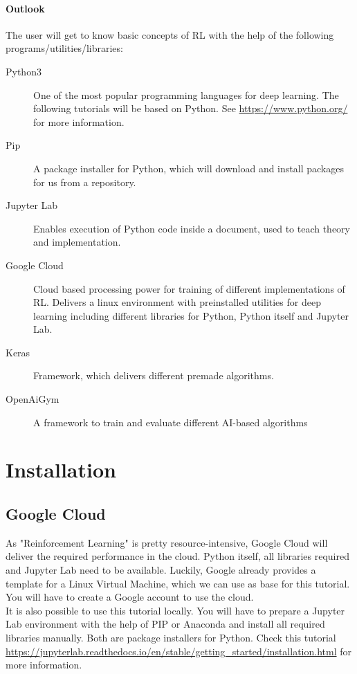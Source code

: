 \documentclass[a4paper]{article}
\begin{document}
\paragraph{Outlook}
The user will get to know basic concepts of RL with the help of the following programs/utilities/libraries:
\begin{description}
	\item[Python3] One of the most popular programming languages for deep learning. The following tutorials will be based on Python. See \url{https://www.python.org/} for more information.
	\item[Pip] A package installer for Python, which will download and install packages for us from a repository.
	\item[Jupyter Lab] Enables execution of Python code inside a document, used to teach theory and implementation. 
	\item[Google Cloud] Cloud based processing power for training of different implementations of RL. Delivers a linux environment with preinstalled utilities for deep learning including different libraries for Python, Python itself and Jupyter Lab.
	\item[Keras] Framework, which delivers different premade algorithms.
	\item[OpenAiGym] A framework to train and evaluate different AI-based algorithms
\end{description}  
\section{Installation}
\subsection{Google Cloud}
As "Reinforcement Learning" is pretty resource-intensive, Google Cloud will deliver the required performance in the cloud. Python itself, all libraries required and Jupyter Lab need to be available. Luckily, Google already provides a template for a Linux Virtual Machine, which we can use as base for this tutorial. You will have to create a Google account to use the cloud.\\
It is also possible to use this tutorial locally. You will have to prepare a Jupyter Lab environment with the help of PIP or Anaconda and install all required libraries manually. Both are package installers for Python. Check this tutorial \url{https://jupyterlab.readthedocs.io/en/stable/getting_started/installation.html} for more information.
\end{document}
